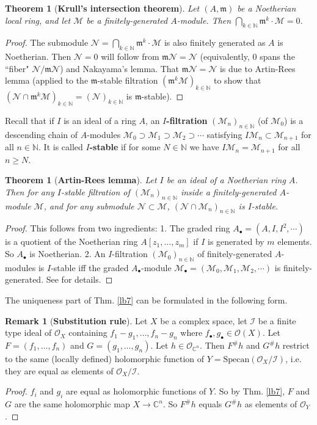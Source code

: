 \documentclass[12pt,b5paper,notitlepage]{report}
\theoremstyle{definition}
\newtheorem{rem}[df]{Remark}
\theoremstyle{plain}
\newtheorem{thm}[df]{Theorem}
\newcommand{\fk}{\mathfrak}
\newcommand{\mc}{\mathcal}
\newcommand{\scr}{\mathscr}
\newcommand{\blt}{\bullet}
\newcommand{\Cbb}{\mathbb C}
\newcommand{\Nbb}{\mathbb N}
\newcommand{\Specan}{\mathrm{Specan}}
\numberwithin{equation}{section}
\begin{document}
\begin{thm}[\textbf{Krull's intersection theorem}] 
Let $(A,\fk m)$ be a Noetherian local ring, and let $\mc M$ be a finitely-generated $A$-module. Then $\bigcap_{k\in\Nbb}\fk m^k\cdot \mc M=0$.
\end{thm}

\begin{proof}
The submodule $\mc N=\bigcap_{k\in\Nbb}\fk m^k\cdot \mc M$ is also finitely generated as $A$ is Noetherian. Then $\mc N=0$ will follow from $\fk m\mc N=\mc N$ (equivalently, $0$ spans the ``fiber" $\mc N/\fk m\mc N$) and  Nakayama's lemma. That  $\fk m\mc N=\mc N$ is due to Artin-Rees lemma (applied to the $\fk m$-stable filtration $(\fk m^k\mc M)_{k\in\Nbb}$ to show that $(\mc N\cap\fk m^k\mc M)_{k\in\Nbb}=(\mc N)_{k\in\Nbb}$ is $\fk m$-stable).
\end{proof}

Recall that if $I$ is an ideal of a ring $A$, an \textbf{$I$-filtration} $(\mc M_n)_{n\in\Nbb}$ (of $\mc M_0$) is a descending chain of $A$-modules $\mc M_0\supset\mc M_1\supset\mc M_2\supset\cdots$ satisfying $I\mc M_n\subset\mc M_{n+1}$ for all $n\in\Nbb$. It is called \textbf{$I$-stable} if for some $N\in\Nbb$ we have $I\mc M_n=\mc M_{n+1}$ for all $n\geq N$.

\begin{thm}[\textbf{Artin-Rees lemma}] 
Let $I$ be an ideal of a Noetherian ring $A$. Then for any $I$-stable filtration of $(\mc M_n)_{n\in\Nbb}$ inside a finitely-generated $A$-module $\mc M$, and for any submodule $\mc N\subset\mc M$, $(\mc N\cap\mc M_n)_{n\in\Nbb}$ is $I$-stable.
\end{thm}

\begin{proof}
This follows from two ingredients: 1. The graded ring $A_\blt=(A,I,I^2,\cdots)$ is a quotient of the Noetherian ring $A[z_1,\dots,z_m]$ if $I$ is generated by $m$ elements. So $A_\blt$ is Noetherian. 2. An $I$-filtration $(\mc M_0)_{n\in\Nbb}$ of finitely-generated $A$-modules is $I$-stable iff the graded $A_\blt$-module $\mc M_\blt=(\mc M_0,\mc M_1,\mc M_2,\cdots)$ is finitely-generated. See \cite[Sec. 10.3]{AM} for details.
\end{proof}


The uniqueness part of Thm. \ref{lb7} can be formulated in the following form.
\begin{rem}[\textbf{Substitution rule}]\label{lb27}
Let $X$ be a complex space, let $\mc I$ be a finite type ideal of $\scr O_X$ containing $f_1-g_1,\dots,f_n-g_n$ where $f_\blt,g_\blt\in\scr O(X)$. Let $F=(f_1,\dots,f_n)$ and $G=(g_1,\dots,g_n)$. Let $h\in\scr O_{\Cbb^n}$. Then $F^\#h$ and $G^\#h$ restrict to the same (locally defined) holomorphic function of $Y=\Specan(\scr O_X/\mc I)$, i.e. they are equal as elements of $\scr O_X/\mc I$.
\end{rem}
\begin{proof}
$f_i$ and $g_i$ are equal as holomorphic functions of $Y$. So by Thm. \ref{lb7}, $F$ and $G$ are the same holomorphic map $X\rightarrow\Cbb^n$. So $F^\#h$ equals $G^\#h$ as elements of $\scr O_Y$.
\end{proof}
\end{document}
